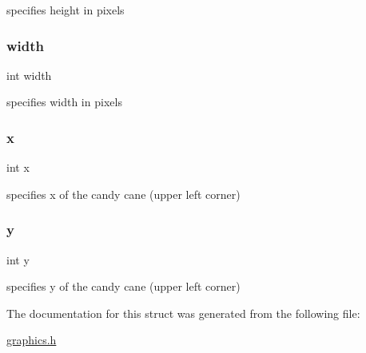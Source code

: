 specifies height in pixels 

\mbox{\label{struct_cane_a2474a5474cbff19523a51eb1de01cda4}} 
\subsubsection{\texorpdfstring{width}{width}}
{\footnotesize\ttfamily int width}



specifies width in pixels 

\mbox{\label{struct_cane_a6150e0515f7202e2fb518f7206ed97dc}} 
\subsubsection{\texorpdfstring{x}{x}}
{\footnotesize\ttfamily int x}



specifies x of the candy cane (upper left corner) 

\mbox{\label{struct_cane_a0a2f84ed7838f07779ae24c5a9086d33}} 
\subsubsection{\texorpdfstring{y}{y}}
{\footnotesize\ttfamily int y}



specifies y of the candy cane (upper left corner) 



The documentation for this struct was generated from the following file\+:\begin{DoxyCompactItemize}
\item 
\hyperlink{graphics_8h}{graphics.\+h}\end{DoxyCompactItemize}
